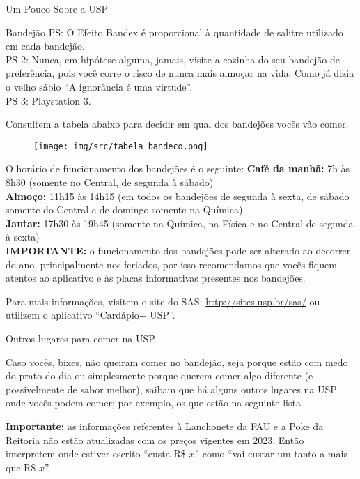 \begin{secao}{Um Pouco Sobre a USP}
\begin{subsecao}{Bandejão}
PS: O Efeito Bandex é proporcional à quantidade de salitre utilizado em cada
bandejão.\\
PS 2: Nunca, em hipótese alguma, jamais, visite a cozinha do seu bandejão de
preferência, pois você corre o risco de nunca mais almoçar na vida. Como já
dizia o velho sábio ``A ignorância é uma virtude''.\\
PS 3: Playstation 3.

Consultem a tabela abaixo para decidir em qual dos bandejões vocês vão comer.

\begin{figure}[!htbp]
\begin{center}
 	\texttt{[image: img/src/tabela\_bandeco.png]}
\end{center}
\end{figure}


O horário de funcionamento dos bandejões é o seguinte:
\textbf{Café da manhã:} 7h às 8h30 (somente no Central, de segunda à sábado)\\
\textbf{Almoço:} 11h15 às 14h15 (em todos os bandejões de segunda à sexta, de sábado 
somente do Central e de domingo somente na Química)\\
\textbf{Jantar:} 17h30 às 19h45 (somente na Química, na Física e no Central de segunda à sexta)\\

\textbf{IMPORTANTE:} o funcionamento dos bandejões pode ser alterado ao decorrer do ano,
principalmente nos feriados, por isso recomendamos que vocês fiquem atentos ao 
aplicativo e às placas informativas presentes nos bandejões.

Para mais informações, visitem o site do SAS: \url{http://sites.usp.br/sas/} ou
utilizem o aplicativo ``Cardápio+ USP''.

\end{subsecao}

\begin{subsecao}{Outros lugares para comer na USP}

Caso vocês, bixes, não queiram comer no bandejão, seja porque estão com medo do
prato do dia ou simplesmente porque querem comer algo diferente (e
possivelmente de sabor melhor), saibam que há alguns outros lugares na USP onde
vocês podem comer; por exemplo, os que estão na seguinte lista.

\textbf{Importante:} as informações referentes à Lanchonete da FAU e a Poke da 
Reitoria não estão atualizadas com os preços vigentes em 2023. Então interpretem 
onde estiver escrito ``custa R\$ $x$'' como ``vai custar um tanto a mais que R\$ $x$''.


\end{subsecao}
\end{secao}
